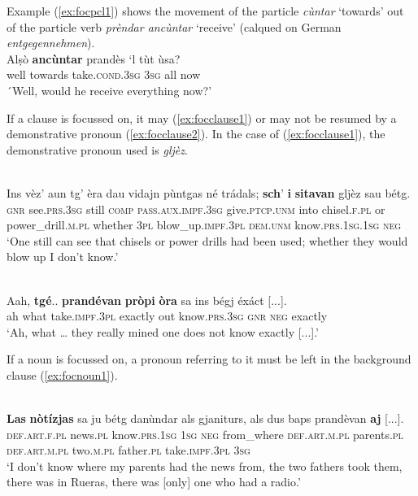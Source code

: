 Example (\ref{ex:focpcl1}) shows the movement of the particle \textit{cùntar} `towards' out of the particle verb \textit{prèndar ancùntar} `receive' (calqued on German \textit{entgegennehmen}).
\ea
\label{ex:focpcl1}
\\
\gll Alṣò \textbf{ancùntar} prandès `l tùt ùsa?\\
well towards take.\textsc{cond.3sg} \textsc{3sg} all	now\\
\glt ´Well, would he receive everything now?'
\z

If a clause is focussed on, it may (\ref{ex:focclause1}) or may not be resumed by a demonstrative pronoun (\ref{ex:focclause2}). In the case of (\ref{ex:focclause1}), the demonstrative pronoun used is \textit{gljèz}.

\ea
\label{ex:focclause1}
\\
\gll Ins vèz’ aun tg’ èra dau vidajn pùntgas né trádals; \textbf{sch}’ \textbf{i} \textbf{sitavan} gljèz sau bétg.\\
\textsc{gnr} see.\textsc{prs.3sg} still \textsc{comp} \textsc{pass.aux.impf.3sg} give.\textsc{ptcp.unm} into chisel.\textsc{f.pl} or power\_drill.\textsc{m.pl} whether \textsc{3pl} blow\_up.\textsc{impf.3pl} \textsc{dem.unm} know.\textsc{prs.1sg.1sg}  \textsc{neg}  \\
`One still can see that chisels or power drills had been used; whether they would blow up I don’t know.'
\z

\ea
\label{ex:focclause2}
\\
\gll   Aah, \textbf{tgé}.. \textbf{prandévan} \textbf{pròpi} \textbf{òra} sa ins bégj éxáct [...]. \\
ah what take.\textsc{impf.3pl} exactly out know.\textsc{prs.3sg} \textsc{gnr} \textsc{neg} exactly\\
\glt `Ah, what … they really mined one does not know exactly [...].'
\z

If a noun is focussed on, a pronoun referring to it must be left in the background clause (\ref{ex:focnoun1}).

\ea
\label{ex:focnoun1}
\\
\gll  \textbf{Las} \textbf{nòtízjas} sa ju bétg danùndar als gjaniturs, als dus baps prandèvan \textbf{aj} [...]. \\
\textsc{def.art.f.pl} news.\textsc{pl} know.\textsc{prs.1sg} \textsc{1sg} \textsc{neg} from\_where \textsc{def.art.m.pl} parents.\textsc{pl} \textsc{def.art.m.pl} two.\textsc{m.pl} father.\textsc{pl} take.\textsc{impf.3pl} \textsc{3sg}\\
\glt `I don’t know where my parents had the news from, the two fathers took them, there was in Rueras, there was [only] one who had a radio.'
\z

